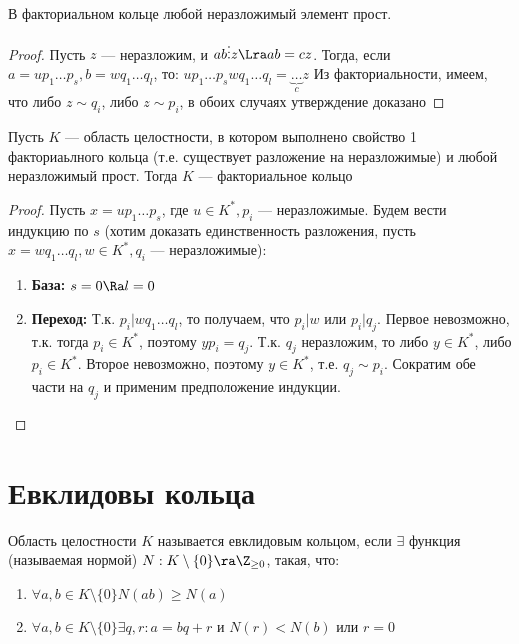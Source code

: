 \begin{proposition}
    В факториальном кольце любой неразложимый элемент прост.
\end{proposition}
\begin{proof}
    Пусть \(z\) --- неразложим, и \(ab \vdots z \Lra ab = cz\). Тогда, если \(a = up_1\dots p_s, b = wq_1\dots q_l\), то: \(up_1\dots p_swq_1\dots q_l = \underbrace{\dots}_cz\)
    Из факториальности, имеем, что либо \(z \sim q_i\), либо \(z \sim p_i\), в обоих случаях утверждение доказано
\end{proof}

\begin{theorem}
    Пусть \(K\) --- область целостности, в котором выполнено свойство 1 факториаьлного кольца (т.е. существует разложение на неразложимые) и любой неразложимый прост. Тогда \(K\) --- факториальное кольцо
\end{theorem}
\begin{proof}
    Пусть \(x = up_1\dots p_s\), где \(u \in K^*, p_i\) --- неразложимые. Будем вести индукцию по \(s\) (хотим доказать единственность разложения, пусть \(x = wq_1\dots q_l, w \in K^*, q_i\) --- неразложимые):
    \begin{enumerate}
        \item \textbf{База:} \(s = 0 \Ra l = 0\)
        \item \textbf{Переход:}
        Т.к. \(p_i | wq_1\dots q_l\), то получаем, что \(p_i | w\) или \(p_i | q_j\). Первое невозможно, т.к. тогда \(p_i \in K^*\), поэтому \(yp_i = q_j\). Т.к. \(q_j\) неразложим, то либо \(y \in K^*\), либо \(p_i \in K^*\). Второе невозможно, поэтому \(y \in K^*\), т.е. \(q_j \sim p_i\). Сократим обе части на \(q_j\) и применим предположение индукции.
    \end{enumerate}
\end{proof}

\section{Евклидовы кольца}

\begin{definition}
    Область целостности \(K\) называется евклидовым кольцом, если \(\exists\) функция (называемая нормой) \(N: K \setminus \{0\} \ra \Z_{\ge 0}\), такая, что:
    \begin{enumerate}
        \item \(\forall a, b \in K \setminus \{0\} N(ab) \ge N(a)\)
        \item \(\forall a, b \in K \setminus \{0\} \exists q, r: a = bq + r\) и \(N(r) < N(b)\) или \(r = 0\)
    \end{enumerate}
\end{definition}


